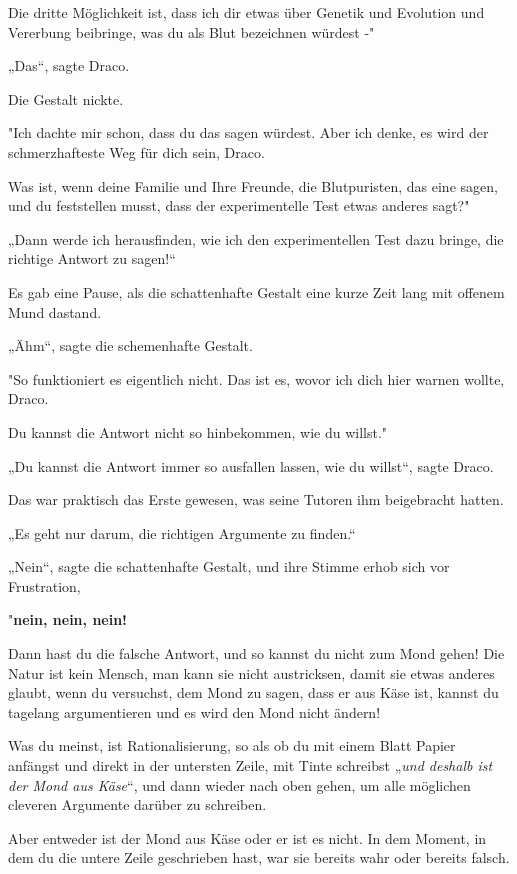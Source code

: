 {Die dritte Möglichkeit ist, dass ich dir etwas über Genetik und Evolution und Vererbung beibringe, was du als Blut bezeichnen würdest -"

„Das“, sagte Draco.

Die Gestalt nickte.

"Ich dachte mir schon, dass du das sagen würdest. Aber ich denke, es wird der schmerzhafteste Weg für dich sein, Draco.

Was ist, wenn deine Familie und Ihre Freunde, die Blutpuristen, das eine sagen, und du feststellen musst, dass der experimentelle Test etwas anderes sagt?"

„Dann werde ich herausfinden, wie ich den experimentellen Test dazu bringe, die richtige Antwort zu sagen!“

Es gab eine Pause, als die schattenhafte Gestalt eine kurze Zeit lang mit offenem Mund dastand.

„Ähm“, sagte die schemenhafte Gestalt.

"So funktioniert es eigentlich nicht. Das ist es, wovor ich dich hier warnen wollte, Draco.

Du kannst die Antwort nicht so hinbekommen, wie du willst."

„Du kannst die Antwort immer so ausfallen lassen, wie du willst“, sagte Draco.

Das war praktisch das Erste gewesen, was seine Tutoren ihm beigebracht hatten.

„Es geht nur darum, die richtigen Argumente zu finden.“

„Nein“, sagte die schattenhafte Gestalt, und ihre Stimme erhob sich vor Frustration,

"\textbf{nein, nein, nein!}

Dann hast du die falsche Antwort, und so kannst du nicht zum Mond gehen! Die Natur ist kein Mensch, man kann sie nicht austricksen, damit sie etwas anderes glaubt, wenn du versuchst, dem Mond zu sagen, dass er aus Käse ist, kannst du tagelang argumentieren und es wird den Mond nicht ändern!

Was du meinst, ist Rationalisierung, so als ob du mit einem Blatt Papier anfängst und direkt in der untersten Zeile, mit Tinte schreibst „\emph{und deshalb ist der Mond aus Käse}“, und dann wieder nach oben gehen, um alle möglichen cleveren Argumente darüber zu schreiben.

Aber entweder ist der Mond aus Käse oder er ist es nicht. In dem Moment, in dem du die untere Zeile geschrieben hast, war sie bereits wahr oder bereits falsch.

}

